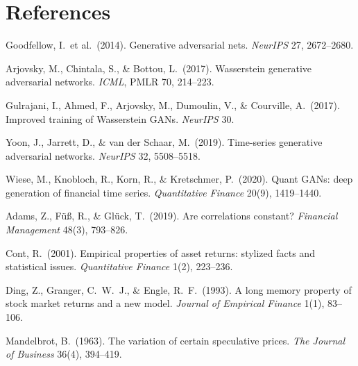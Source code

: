 \documentclass[11pt,a4paper]{article}
\makeatletter
\DeclareRobustCommand{\_}{\ifmmode\nfss@text{\textunderscore}\else\textunderscore\allowbreak\fi}
\makeatother
\begin{document}
\section*{References}
\label{sec:references}
{\small
\begin{enumerate}[label={\textbf{[\arabic*]}},leftmargin=2.8em,itemsep=4pt,parsep=0pt,topsep=2pt]

\item \hypertarget{R:1}{}%
  Goodfellow, I.\ et al.\ (2014). Generative adversarial nets. \textit{NeurIPS} 27, 2672--2680.

\item \hypertarget{R:2}{}%
  Arjovsky, M., Chintala, S., \& Bottou, L.\ (2017). Wasserstein generative adversarial networks. \textit{ICML}, PMLR 70, 214--223.

\item \hypertarget{R:3}{}%
  Gulrajani, I., Ahmed, F., Arjovsky, M., Dumoulin, V., \& Courville, A.\ (2017). Improved training of Wasserstein GANs. \textit{NeurIPS} 30.

\item \hypertarget{R:4}{}%
  Yoon, J., Jarrett, D., \& van der Schaar, M.\ (2019). Time-series generative adversarial networks. \textit{NeurIPS} 32, 5508--5518.

\item \hypertarget{R:5}{}%
  Wiese, M., Knobloch, R., Korn, R., \& Kretschmer, P.\ (2020). Quant GANs: deep generation of financial time series. \textit{Quantitative Finance} 20(9), 1419--1440.

\item \hypertarget{R:6}{}%
  Adams, Z., F\"u{\ss}, R., \& Gl\"uck, T.\ (2019). Are correlations constant? \textit{Financial Management} 48(3), 793--826.

\item \hypertarget{R:7}{}%
  Cont, R.\ (2001). Empirical properties of asset returns: stylized facts and statistical issues. \textit{Quantitative Finance} 1(2), 223--236.

\item \hypertarget{R:8}{}%
  Ding, Z., Granger, C.\ W.\ J., \& Engle, R.\ F.\ (1993). A long memory property of stock market returns and a new model. \textit{Journal of Empirical Finance} 1(1), 83--106.

\item \hypertarget{R:9}{}%
  Mandelbrot, B.\ (1963). The variation of certain speculative prices. \textit{The Journal of Business} 36(4), 394--419.


\end{enumerate}}
\end{document}
